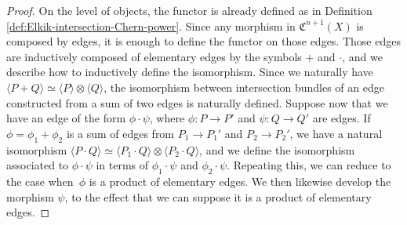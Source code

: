 \documentclass[11pt]{article}
\theoremstyle{plain}
\theoremstyle{definition}
\newcommand{\Cfrak}{\mathfrak C}
\begin{document}
\begin{proof}
On the level of objects, the functor is already defined as in Definition \ref{def:Elkik-intersection-Chern-power}. Since any morphism in $\Cfrak^{n+1}(X)$ is composed by edges, it is enough to define the functor on those edges. Those edges are inductively composed of elementary edges by the symbols $+$ and $\cdot$, and we describe how to inductively define the isomorphism. Since we naturally have $\langle P + Q \rangle \simeq \langle P \rangle \otimes \langle Q \rangle$, the isomorphism between intersection bundles of an edge constructed from a sum of two edges is naturally defined. Suppose now that we have an edge of the form $\phi \cdot \psi$, where $\phi: P \to P'$ and $\psi: Q \to Q'$ are edges. If $\phi = \phi_1 + \phi_2$ is a sum of edges from $P_1 \to P_1'$ and $P_2 \to P_2'$, we have a natural isomorphism $\langle P \cdot Q\rangle \simeq \langle P_1 \cdot Q \rangle \otimes \langle P_2 \cdot Q \rangle $, and we define the isomorphism associated to $\phi \cdot \psi$ in terms of $\phi_1 \cdot \psi$ and $\phi_2 \cdot \psi$. Repeating this, we can reduce to the case when~$\phi$ is a product of elementary edges. We then likewise develop the morphism $\psi$, to the effect that we can suppose it is a product of elementary edges.


\end{proof}
\end{document}
